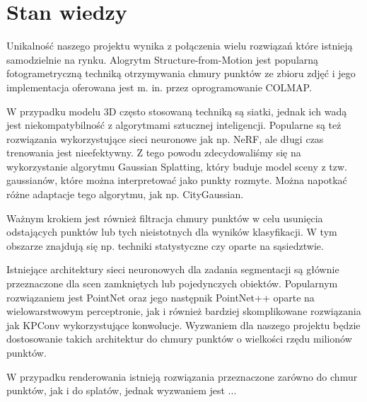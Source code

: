 \section{Stan wiedzy}

Unikalność naszego projektu wynika z połączenia wielu rozwiązań które istnieją samodzielnie na rynku. Alogrytm Structure-from-Motion jest popularną fotogrametryczną techniką otrzymywania chmury punktów ze zbioru zdjęć i jego implementacja oferowana jest m. in. przez oprogramowanie COLMAP. 

W przypadku modelu 3D często stosowaną techniką są siatki, jednak ich wadą jest niekompatybilność z algorytmami sztucznej inteligencji. Popularne są też rozwiązania wykorzystujące sieci neuronowe jak np. NeRF\cite{mildenhall2020nerfrepresentingscenesneural}, ale długi czas trenowania jest nieefektywny. Z tego powodu zdecydowaliśmy się na wykorzystanie algorytmu Gaussian Splatting\cite{kerbl3Dgaussians}, który buduje model sceny z tzw. gaussianów, które można interpretować jako punkty rozmyte. Można napotkać różne adaptacje tego algorytmu, jak np. CityGaussian\cite{liu2024citygaussian}.

Ważnym krokiem jest również filtracja chmury punktów w celu usunięcia odstających punktów lub tych nieistotnych dla wyników klasyfikacji. W tym obszarze znajdują się np. techniki statystyczne czy oparte na sąsiedztwie. 

Istniejące architektury sieci neuronowych dla zadania segmentacji są głównie przeznaczone dla scen zamkniętych lub pojedynczych obiektów. Popularnym rozwiązaniem jest PointNet\cite{qi2016pointnet} oraz jego następnik PointNet++\cite{qi2017pointnetdeephierarchicalfeature} oparte na wielowarstwowym perceptronie, jak i również bardziej skomplikowane rozwiązania jak KPConv\cite{thomas2019kpconvflexibledeformableconvolution} wykorzystujące konwolucje. Wyzwaniem dla naszego projektu będzie dostosowanie takich architektur do chmury punktów o wielkości rzędu milionów punktów.  

W przypadku renderowania istnieją rozwiązania przeznaczone zarówno do chmur punktów, jak i do splatów, jednak wyzwaniem jest ...

